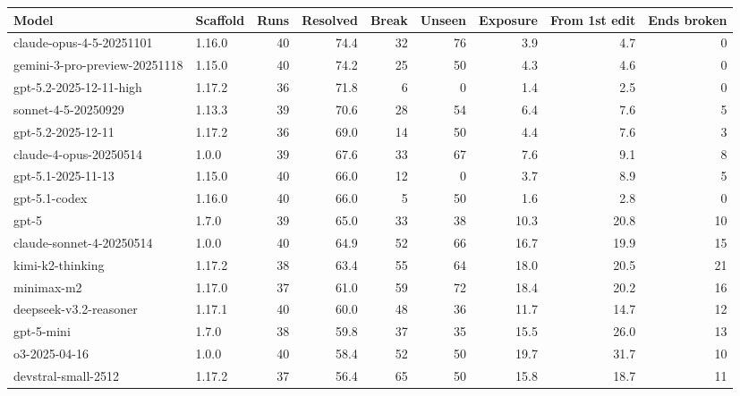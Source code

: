 {\footnotesize
\begin{tabular}{@{}llrrrrrrr@{}}
\toprule
Model & Scaffold & Runs & Resolved & Break & Unseen & Exposure & From 1st edit & Ends broken \\
\midrule
claude-opus-4-5-20251101 & 1.16.0 & 40 & 74.4 & 32 & 76 & 3.9 & 4.7 & 0 \\
gemini-3-pro-preview-20251118 & 1.15.0 & 40 & 74.2 & 25 & 50 & 4.3 & 4.6 & 0 \\
gpt-5.2-2025-12-11-high & 1.17.2 & 36 & 71.8 & 6 & 0 & 1.4 & 2.5 & 0 \\
sonnet-4-5-20250929 & 1.13.3 & 39 & 70.6 & 28 & 54 & 6.4 & 7.6 & 5 \\
gpt-5.2-2025-12-11 & 1.17.2 & 36 & 69.0 & 14 & 50 & 4.4 & 7.6 & 3 \\
claude-4-opus-20250514 & 1.0.0 & 39 & 67.6 & 33 & 67 & 7.6 & 9.1 & 8 \\
gpt-5.1-2025-11-13 & 1.15.0 & 40 & 66.0 & 12 & 0 & 3.7 & 8.9 & 5 \\
gpt-5.1-codex & 1.16.0 & 40 & 66.0 & 5 & 50 & 1.6 & 2.8 & 0 \\
gpt-5 & 1.7.0 & 39 & 65.0 & 33 & 38 & 10.3 & 20.8 & 10 \\
claude-sonnet-4-20250514 & 1.0.0 & 40 & 64.9 & 52 & 66 & 16.7 & 19.9 & 15 \\
kimi-k2-thinking & 1.17.2 & 38 & 63.4 & 55 & 64 & 18.0 & 20.5 & 21 \\
minimax-m2 & 1.17.0 & 37 & 61.0 & 59 & 72 & 18.4 & 20.2 & 16 \\
deepseek-v3.2-reasoner & 1.17.1 & 40 & 60.0 & 48 & 36 & 11.7 & 14.7 & 12 \\
gpt-5-mini & 1.7.0 & 38 & 59.8 & 37 & 35 & 15.5 & 26.0 & 13 \\
o3-2025-04-16 & 1.0.0 & 40 & 58.4 & 52 & 50 & 19.7 & 31.7 & 10 \\
devstral-small-2512 & 1.17.2 & 37 & 56.4 & 65 & 50 & 15.8 & 18.7 & 11 \\

\end{tabular}}

